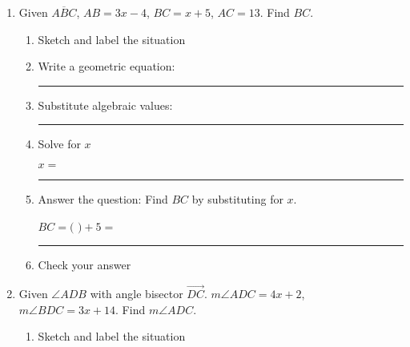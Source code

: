 \documentclass[12pt, twoside]{article}
\begin{document}
\begin{enumerate}
        \item Given $\overline{ABC}$, $AB=3x-4$, $BC=x+5$, $AC=13$. Find ${BC}$.
        \begin{enumerate}
          \item Sketch and label the situation
          \begin{flushright}
          \end{flushright} \vspace{2cm}
          \item Write a geometric equation: \rule{5cm}{0.15mm} \vspace{1.5cm}
          \item Substitute algebraic values: \rule{5cm}{0.15mm} \bigskip
          \item Solve for $x$
          \vspace{5cm}
          \begin{center} $x=$ \rule{1cm}{0.15mm} \end{center} \bigskip
          \item Answer the question: Find $BC$ by substituting for $x$. \bigskip
          \begin{center} $BC=($ \hspace{1cm} $)+5=$ \rule{1cm}{0.15mm} \end{center} \bigskip
          \item Check your answer
        \end{enumerate}
        \vspace{2cm}

  \newpage
        \item Given $\angle ADB$ with angle bisector $\overrightarrow{DC}$. $m\angle ADC = 4x+2$, $m\angle BDC = 3x+14$. Find $m\angle ADC$.  %
        \begin{enumerate}
          \item Sketch and label the situation
          \begin{flushright}
          \end{flushright}
          \vspace{.5cm}


\end{enumerate}
\end{enumerate}
\end{document}

